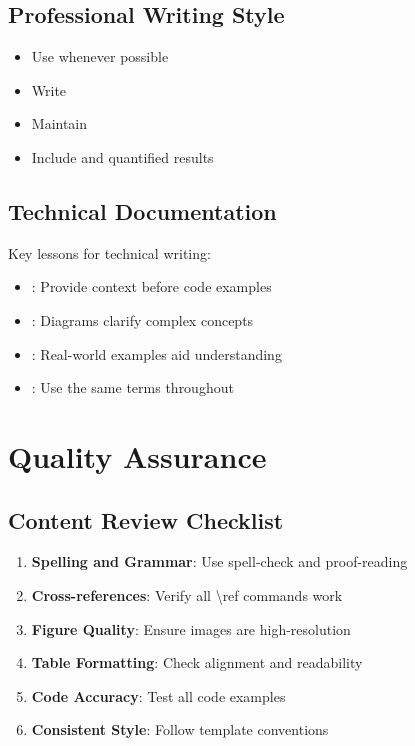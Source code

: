 \documentclass{internshipreport}
\begin{document}
\subsection{Professional Writing Style}

\begin{itemize}
\item Use  whenever possible
\item Write 
\item Maintain 
\item Include  and quantified results
\end{itemize}

\subsection{Technical Documentation}

\begin{lessonslearned}
Key lessons for technical writing:
\begin{itemize}
\item {}: Provide context before code examples
\item {}: Diagrams clarify complex concepts
\item {}: Real-world examples aid understanding
\item {}: Use the same terms throughout
\end{itemize}
\end{lessonslearned}

\section{Quality Assurance}

\subsection{Content Review Checklist}

\begin{enumerate}
\item \textbf{Spelling and Grammar}: Use spell-check and proof-reading
\item \textbf{Cross-references}: Verify all \textbackslash ref commands work
\item \textbf{Figure Quality}: Ensure images are high-resolution
\item \textbf{Table Formatting}: Check alignment and readability
\item \textbf{Code Accuracy}: Test all code examples
\item \textbf{Consistent Style}: Follow template conventions
\end{enumerate}
\end{document}
